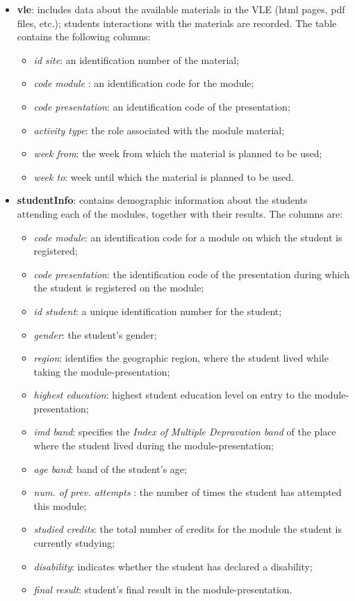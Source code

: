 \documentclass{article}
\begin{document}
\begin{itemize}
    
    \item \textbf{vle}: includes data about the available materials in the VLE (html pages, pdf files, etc.); students interactions with the materials are recorded. The table contains the following columns:
    \begin{itemize}
        \item \textit{id site}: an identification number of the material;
        \item \textit{code module }: an identification code for the module;
        \item \textit{code presentation}: an identification code of the presentation;
        \item \textit{activity type}: the role associated with the module material;
        \item \textit{week from}: the week from which the material is planned to be used;
        \item \textit{week to}: week until which the material is planned to be used.
    \end{itemize}

    \item \textbf{studentInfo}: contains demographic information about the students attending each of the modules, together with their results. The columns are:
    \begin{itemize}
        \item \textit{code module}: an identification code for a module on which the student is registered;
        \item \textit{code presentation}: the identification code of the presentation during which the student is registered on the module;
        \item \textit{id student}: a unique identification number for the student;
        \item \textit{gender}: the student’s gender;
        \item \textit{region}: identifies the geographic region, where the student lived while taking the module-presentation;
        \item \textit{highest education}: highest student education level on entry to the module-presentation;
        \item \textit{imd band}: specifies the \textit{Index of Multiple Depravation band} of the place where the student lived during the module-presentation;
        \item \textit{age band}: band of the student’s age;
        \item \textit{num. of prev. attempts }: the number of times the student has attempted this module;
        \item \textit{studied credits}: the total number of credits for the module the student is currently studying;
        \item \textit{disability}: indicates whether the student has declared a disability;
        \item \textit{final result}: student’s final result in the module-presentation.
    \end{itemize}


\end{itemize}
\end{document}
